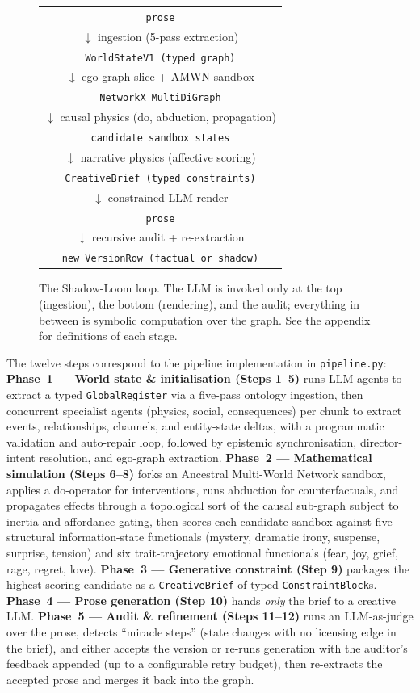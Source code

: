 \documentclass[11pt]{article}
\begin{document}
\begin{figure}[h]
\centering
\small
\begin{tabular}{c}
\texttt{prose}\\
$\downarrow$ \scriptsize ingestion (5-pass extraction)\\
\texttt{WorldStateV1 (typed graph)}\\
$\downarrow$ \scriptsize ego-graph slice + AMWN sandbox\\
\texttt{NetworkX MultiDiGraph}\\
$\downarrow$ \scriptsize causal physics (do, abduction, propagation)\\
\texttt{candidate sandbox states}\\
$\downarrow$ \scriptsize narrative physics (affective scoring)\\
\texttt{CreativeBrief (typed constraints)}\\
$\downarrow$ \scriptsize constrained LLM render\\
\texttt{prose}\\
$\downarrow$ \scriptsize recursive audit + re-extraction\\
\texttt{new VersionRow (factual or shadow)}\\
\end{tabular}
\caption{The Shadow-Loom loop. The LLM is invoked only at the top
(ingestion), the bottom (rendering), and the audit; everything in
between is symbolic computation over the graph. See the appendix
for definitions of each stage.}
\label{fig:pipeline}
\end{figure}

The twelve steps correspond to the pipeline implementation in
\texttt{pipeline.py}:
\textbf{Phase~1 --- World state \& initialisation (Steps 1--5)} runs LLM
agents to extract a typed \texttt{GlobalRegister} via a five-pass
ontology ingestion, then concurrent specialist agents
(physics, social, consequences) per chunk to extract events,
relationships, channels, and entity-state deltas, with a
programmatic validation and auto-repair loop, followed by
epistemic synchronisation, director-intent resolution, and
ego-graph extraction.
\textbf{Phase~2 --- Mathematical simulation (Steps 6--8)} forks an
Ancestral Multi-World Network sandbox, applies a do-operator for
interventions, runs abduction for counterfactuals, and propagates
effects through a topological sort of the causal sub-graph subject
to inertia and affordance gating, then scores each candidate sandbox
against five structural information-state functionals (mystery,
dramatic irony, suspense, surprise, tension) and six trait-trajectory
emotional functionals (fear, joy, grief, rage, regret, love).
\textbf{Phase~3 --- Generative constraint (Step 9)} packages the
highest-scoring candidate as a \texttt{CreativeBrief} of typed
\texttt{ConstraintBlock}s.
\textbf{Phase~4 --- Prose generation (Step 10)} hands \emph{only} the
brief to a creative LLM.
\textbf{Phase~5 --- Audit \& refinement (Steps 11--12)} runs an
LLM-as-judge over the prose, detects ``miracle steps'' (state changes
with no licensing edge in the brief), and either accepts the version
or re-runs generation with the auditor's feedback appended (up to a
configurable retry budget), then re-extracts the accepted prose and
merges it back into the graph.
\end{document}
